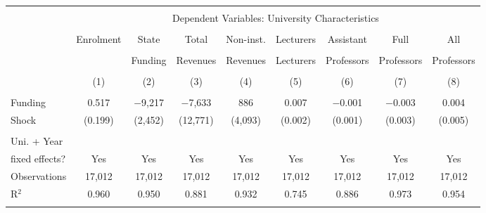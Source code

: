 
\begin{tabular}{@{\extracolsep{5pt}}lcccccccc} 
\\[-1.8ex]\hline 
\hline \\[-1.8ex] 
 & \multicolumn{8}{c}{Dependent Variables: University Characteristics} \\ 
\cline{2-9}
\\[-1.8ex] & Enrolment & State & Total & Non-inst. & Lecturers & Assistant & Full & All \\ 
\\[-1.8ex] &           & Funding & Revenues & Revenues & Lecturers & Professors & Professors & Professors \\
\\[-1.8ex] & (1) & (2) & (3) & (4) & (5) & (6) & (7) & (8)\\ 
\hline \\[-1.8ex] 
 Funding & 0.517   & $-$9,217 & $-$7,633 & 886 & 0.007 & $-$0.001 & $-$0.003 & 0.004 \\ 
 Shock   & (0.199) & (2,452) & (12,771) & (4,093) & (0.002) & (0.001) & (0.003) & (0.005) \\ 
 \hline \\[-1.8ex] 
Uni. + Year \\
fixed effects? & Yes & Yes & Yes & Yes & Yes & Yes & Yes & Yes \\
Observations & 17,012 & 17,012 & 17,012 & 17,012 & 17,012 & 17,012 & 17,012 & 17,012 \\ 
R$^{2}$ & 0.960 & 0.950 & 0.881 & 0.932 & 0.745 & 0.886 & 0.973 & 0.954 \\ 
\hline 
\hline \\[-1.8ex] 
\end{tabular} 
